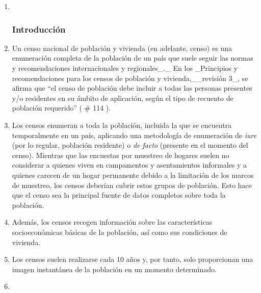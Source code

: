 \documentclass[
]{book}
\begin{document}
\begin{enumerate}
\def\labelenumi{\arabic{enumi}.}
\item ~
  \hypertarget{introducciuxf3n-5}{%
  \subsubsection{Introducción}\label{introducciuxf3n-5}}
\item
  Un censo nacional de población y vivienda (en adelante, censo) es una enumeración completa de la población de un país que suele seguir las normas y recomendaciones internacionales y regionales\_.\_ En los \_Principios y recomendaciones para los censos de población y vivienda,\_\_revisión 3\_, se afirma que ``el censo de población debe incluir a todas las personas presentes y/o residentes en su ámbito de aplicación, según el tipo de recuento de población requerido'' (
  \# 114
  ).
\item
  Los censos enumeran a toda la población, incluida la que se encuentra temporalmente en un país, aplicando una metodología de enumeración de \emph{iure} (por lo regular, población residente) o \emph{de facto} (presente en el momento del censo). Mientras que las encuestas por muestreo de hogares suelen no considerar a quienes viven en campamentos y asentamientos informales y a quienes carecen de un hogar permanente debido a la limitación de los marcos de muestreo, los censos deberían cubrir estos grupos de población. Esto hace que el censo sea la principal fuente de datos completos sobre toda la población.
\item
  Además, los censos recogen información sobre las características socioeconómicas básicas de la población, así como sus condiciones de vivienda.
\item
  Los censos suelen realizarse cada 10 años y, por tanto, solo proporcionan una imagen instantánea de la población en un momento determinado.
\item ~
  \hypertarget{posibilidades-y-dificultades-de-utilizar-el-censo-para-estimar-el-nuxfamero-de-pdi}{%
}
\end{enumerate}
\end{document}
